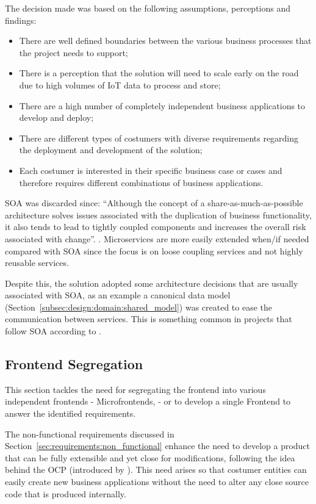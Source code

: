 The decision made was based on the following assumptions, perceptions and findings:

\begin{itemize}
   \item There are well defined boundaries between the various business processes that the project needs to support;
   \item There is a perception that the solution will need to scale early on the road due to high volumes of \gls{IoT} data to process and store;
   \item There are a high number of completely independent business applications to develop and deploy;
   \item There are different types of costumers with diverse requirements regarding the deployment and development of the solution;
   \item Each costumer is interested in their specific business case or cases and therefore requires different combinations of business applications.
\end{itemize}

\gls{SOA} was discarded since: ``Although the concept of a share-as-much-as-possible architecture solves issues associated with the duplication of business functionality, it also tends to lead to tightly coupled components and increases the overall risk associated with change''. \parencite{richards2015microservices}. Microservices are more easily extended when/if needed compared with \gls{SOA} since the focus is on loose coupling services and not highly reusable services.

Despite this, the solution adopted some architecture decisions that are usually associated with \gls{SOA}, as an example a canonical data model (Section~\ref{subsec:design:domain:shared_model}) was created to ease the communication between services. This is something common in projects that follow \gls{SOA} according to \cite{cerny2017disambiguation}.

\subsection{Frontend Segregation}
\label{subsec:design:alternatives:frontend}

This section tackles the need for segregating the frontend into various independent frontends - Microfrontends, \cite{microfrontends} - or to develop a single Frontend to answer the identified requirements.

The non-functional requirements discussed in Section~\ref{sec:requirements:non_functional} enhance the need to develop a product that can be fully extensible and yet close for modifications, following the idea behind the \gls{OCP} (introduced by \cite{martin2003agile}). This need arises so that costumer entities can easily create new business applications without the need to alter any close source code that is produced internally.

